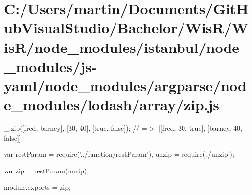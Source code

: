 \hypertarget{_c_1_2_users_2martin_2_documents_2_git_hub_visual_studio_2_bachelor_2_wis_r_2_wis_r_2node_module7d687862e341b1face76b98d07279e22}{}\section{C\+:/\+Users/martin/\+Documents/\+Git\+Hub\+Visual\+Studio/\+Bachelor/\+Wis\+R/\+Wis\+R/node\+\_\+modules/istanbul/node\+\_\+modules/js-\/yaml/node\+\_\+modules/argparse/node\+\_\+modules/lodash/array/zip.\+js}
\+\_\+.\+zip(\mbox{[}\textquotesingle{}fred\textquotesingle{}, \textquotesingle{}barney\textquotesingle{}\mbox{]}, \mbox{[}30, 40\mbox{]}, \mbox{[}true, false\mbox{]}); // =$>$ \mbox{[}\mbox{[}\textquotesingle{}fred\textquotesingle{}, 30, true\mbox{]}, \mbox{[}\textquotesingle{}barney\textquotesingle{}, 40, false\mbox{]}\mbox{]}


\begin{DoxyCodeInclude}
var restParam = require(\textcolor{stringliteral}{'../function/restParam'}),
    unzip = require(\textcolor{stringliteral}{'./unzip'});

var zip = restParam(unzip);

module.exports = zip;
\end{DoxyCodeInclude}
 